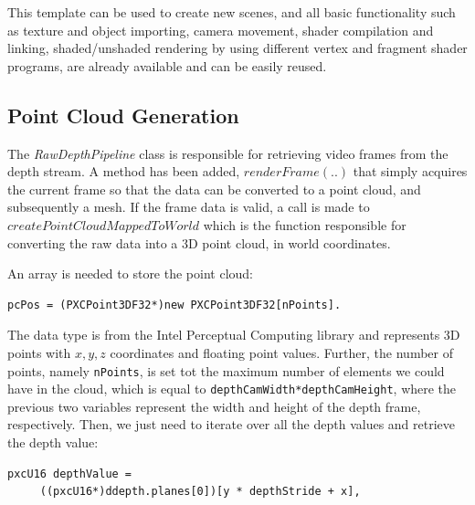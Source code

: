 \documentclass[]{article}
\begin{document}
This template can be used to create new scenes, and all basic functionality such as texture and object importing, camera movement, shader compilation and linking, shaded/unshaded rendering by using different vertex and fragment shader programs, are already available and can be easily reused.

\subsection{Point Cloud Generation}

The \textit{RawDepthPipeline} class is responsible for retrieving video frames from the depth stream. A method has been added, $renderFrame(..)$ that simply acquires the current frame so that the data can be converted to a point cloud, and subsequently a mesh. If the frame data is valid, a call is made to $createPointCloudMappedToWorld$ which is the function responsible for converting the raw data into a 3D point cloud, in world coordinates.

An array is needed to store the point cloud:


\begin{verbatim}pcPos = (PXCPoint3DF32*)new PXCPoint3DF32[nPoints].\end{verbatim} 


The data type is from the Intel Perceptual Computing library and represents 3D points with $x,y,z$ coordinates and floating point values. Further, the number of points, namely \verb|nPoints|, is set tot the maximum number of elements we could have in the cloud, which is equal to \verb|depthCamWidth*depthCamHeight|, where the previous two variables represent the width and height of the depth frame, respectively. Then, we just need to iterate over all the depth values and retrieve the depth value:

 \begin{verbatim}pxcU16 depthValue = 
     ((pxcU16*)ddepth.planes[0])[y * depthStride + x],\end{verbatim} 
 
\end{document}
